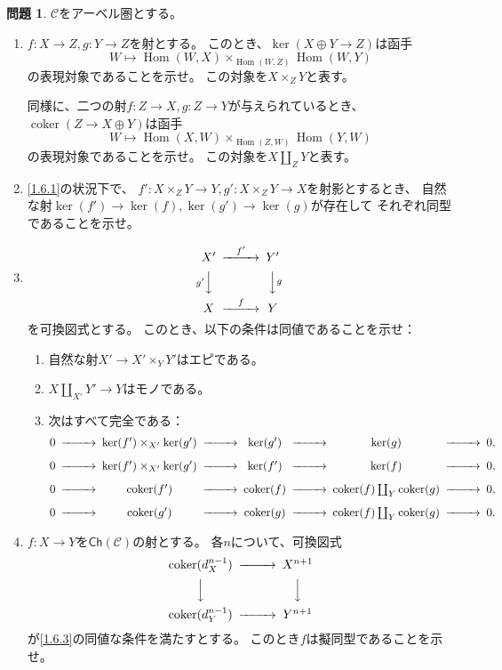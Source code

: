 \documentclass[uplatex,dvipdfmx]{jsarticle}
\theoremstyle{definition}
\newtheorem{prob}[prob]{問題}
\DeclareMathOperator{\Hom}{\mathrm{Hom}}
\DeclareMathOperator{\coker}{\mathrm{coker}}
\newcommand{\Ch}{\mathsf{Ch}}
\newcommand\mcC{\mathcal{C}}
\begin{document}
\begin{prob}\label{1.6}
  \(\mcC\)をアーベル圏とする。
  \begin{enumerate}
    \item \label{1.6.1}
    \(f:X\to Z,g: Y\to Z\)を射とする。
    このとき、\(\ker(X\oplus Y\to Z)\)は函手
    \[
    W\mapsto \Hom(W,X) \times_{\Hom(W,Z)}\Hom(W,Y)
    \]
    の表現対象であることを示せ。
    この対象を\(X\times_ZY\)と表す。

    同様に、二つの射\(f:Z\to X, g:Z\to Y\)が与えられているとき、
    \(\coker(Z\to X\oplus Y)\)は函手
    \[
    W\mapsto \Hom(X,W)\times_{\Hom(Z,W)}\Hom(Y,W)
    \]
    の表現対象であることを示せ。
    この対象を\(X\coprod_ZY\)と表す。
    \item \label{1.6.2}
    \ref{1.6.1}の状況下で、
    \(f':X\times_ZY\to Y, g':X\times_ZY\to X\)を射影とするとき、
    自然な射\(\ker(f')\to \ker(f), \ker(g')\to \ker(g)\)が存在して
    それぞれ同型であることを示せ。
    \item \label{1.6.3}
    \[
    \begin{CD}
      X' @> f' >>Y' \\
      @V g' VV @VV g V \\
      X @> f >> Y
    \end{CD}
    \]
    を可換図式とする。
    このとき、以下の条件は同値であることを示せ：
    \begin{enumerate}
      \item \label{1.6.3.1}
      自然な射\(X'\to X'\times_YY'\)はエピである。
      \item \label{1.6.3.2}
      \(X\coprod_{X'}Y'\to Y\)はモノである。
      \item \label{1.6.3.3}
      次はすべて完全である：
      \[
      \begin{CD}
        0 @>>> \ker(f')\times_{X'}\ker(g') @>>> \ker(g') @>>> \ker(g) @>>> 0, \\
        0 @>>> \ker(f')\times_{X'}\ker(g') @>>> \ker(f') @>>> \ker(f) @>>> 0, \\
        0 @>>> \coker(f') @>>> \coker(f) @>>> \coker(f)\coprod_Y\coker(g) @>>> 0, \\
        0 @>>> \coker(g') @>>> \coker(g) @>>> \coker(f)\coprod_Y\coker(g) @>>> 0.
      \end{CD}
      \]
    \end{enumerate}
    \item \label{1.6.4}
    \(f:X\to Y\)を\(\Ch(\mcC)\)の射とする。
    各\(n\)について、可換図式
    \[
    \begin{CD}
      \coker(d^{n-1}_X) @>>> X^{n+1} \\
      @VVV @VVV \\
      \coker(d^{n-1}_Y) @>>> Y^{n+1}
    \end{CD}
    \]
    が\ref{1.6.3}の同値な条件を満たすとする。
    このとき\(f\)は擬同型であることを示せ。
  \end{enumerate}
\end{prob}
\end{document}
